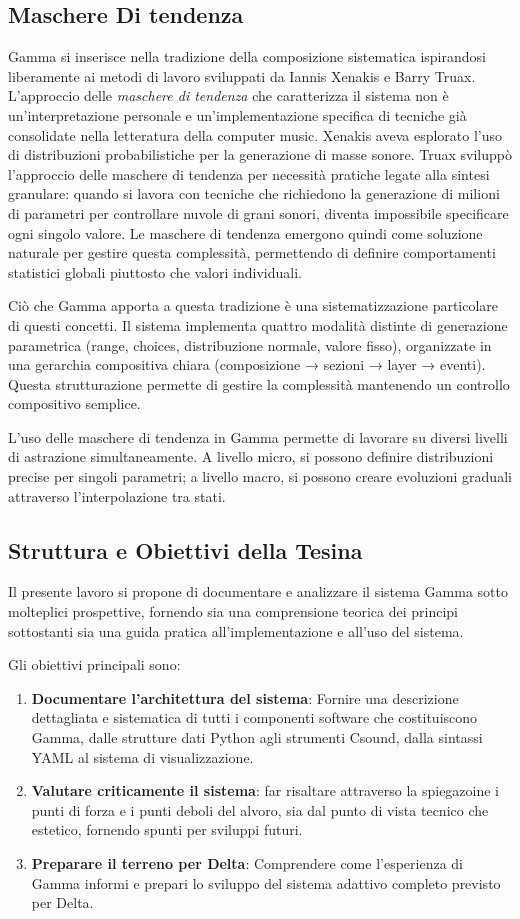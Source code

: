 \subsection{Maschere Di tendenza}
Gamma si inserisce nella tradizione della composizione sistematica ispirandosi liberamente ai metodi di lavoro sviluppati da Iannis Xenakis e Barry Truax. L'approccio delle \textit{maschere di tendenza} che caratterizza il sistema non è un'interpretazione personale e un'implementazione specifica di tecniche già consolidate nella letteratura della computer music. Xenakis aveva esplorato l'uso di distribuzioni probabilistiche per la generazione di masse sonore. Truax sviluppò l'approccio delle maschere di tendenza per necessità pratiche legate alla sintesi granulare: quando si lavora con tecniche che richiedono la generazione di milioni di parametri per controllare nuvole di grani sonori, diventa impossibile specificare ogni singolo valore. Le maschere di tendenza emergono quindi come soluzione naturale per gestire questa complessità, permettendo di definire comportamenti statistici globali piuttosto che valori individuali.

Ciò che Gamma apporta a questa tradizione è una sistematizzazione particolare di questi concetti. Il sistema implementa quattro modalità distinte di generazione parametrica (range, choices, distribuzione normale, valore fisso), organizzate in una gerarchia compositiva chiara (composizione → sezioni → layer → eventi). Questa strutturazione permette di gestire la complessità mantenendo un controllo compositivo semplice.

L'uso delle maschere di tendenza in Gamma permette di lavorare su diversi livelli di astrazione simultaneamente. A livello micro, si possono definire distribuzioni precise per singoli parametri; a livello macro, si possono creare evoluzioni graduali attraverso l'interpolazione tra stati.
\subsection{Struttura e Obiettivi della Tesina}
Il presente lavoro si propone di documentare e analizzare il sistema Gamma sotto molteplici prospettive, fornendo sia una comprensione teorica dei principi sottostanti sia una guida pratica all'implementazione e all'uso del sistema.

Gli obiettivi principali sono:

\begin{enumerate}
    \item \textbf{Documentare l'architettura del sistema}: Fornire una descrizione dettagliata e sistematica di tutti i componenti software che costituiscono Gamma, dalle strutture dati Python agli strumenti Csound, dalla sintassi YAML al sistema di visualizzazione.
    \item \textbf{Valutare criticamente il sistema}: far risaltare attraverso la spiegazoine i punti di forza e i punti deboli del alvoro, sia dal punto di vista tecnico che estetico, fornendo spunti per sviluppi futuri.
    \item \textbf{Preparare il terreno per Delta}: Comprendere come l'esperienza di Gamma informi e prepari lo sviluppo del sistema adattivo completo previsto per Delta.
\end{enumerate}